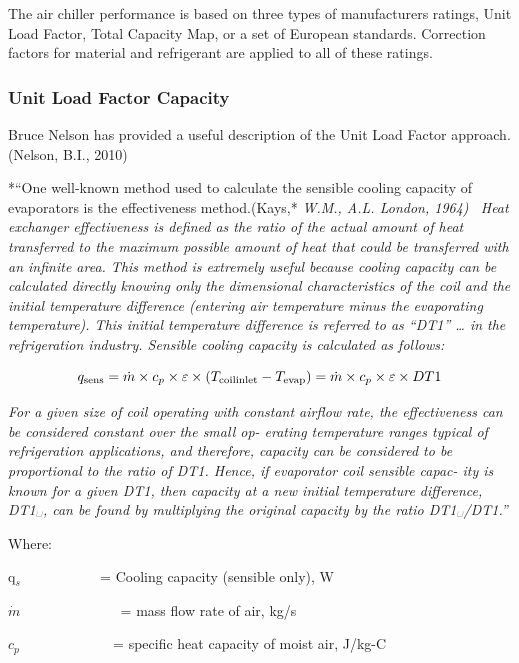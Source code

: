 The air chiller performance is based on three types of manufacturers ratings, Unit Load Factor, Total Capacity Map, or a set of European standards. Correction factors for material and refrigerant are applied to all of these ratings.

\subsubsection{Unit Load Factor Capacity}\label{unit-load-factor-capacity}

Bruce Nelson has provided a useful description of the Unit Load Factor approach.(Nelson, B.I., 2010)

*``One well-known method used to calculate the sensible cooling capacity of evaporators is the effectiveness method.(Kays,* \emph{W.M., A.L. London, 1964) ~Heat exchanger effectiveness is defined as the ratio of the actual amount of heat transferred to the maximum possible amount of heat that could be transferred with an infinite area. This method is extremely useful because cooling capacity can be calculated directly knowing only the dimensional characteristics of the coil and the initial temperature difference (entering air temperature minus the evaporating temperature). This initial temperature difference is referred to as ``DT1'' \ldots{} in the refrigeration industry. Sensible cooling capacity is calculated as follows:}

\begin{equation}
{q_{{\rm{sens}}}} = \dot m \times {c_p} \times \varepsilon  \times ({T_{{\rm{coil inlet}}}} - {T_{{\rm{evap}}}}) = \dot m \times {c_p} \times \varepsilon  \times DT1
\end{equation}

\emph{For a given size of coil operating with constant airflow rate, the effectiveness can be considered constant over the small op- erating temperature ranges typical of refrigeration applications, and therefore, capacity can be considered to be proportional to the ratio of DT1. Hence, if evaporator coil sensible capac- ity is known for a given DT1, then capacity at a new initial temperature difference, DT1␣, can be found by multiplying the original capacity by the ratio DT1␣/DT1.''}

Where:

q\(_{s}\) ~~~~~~~~~~ = Cooling capacity (sensible only), W

\(\dot m\) ~~~~~~~~~~~~~ = mass flow rate of air, kg/s

\({c_p}\) ~~~~~~~~~~~~ = specific heat capacity of moist air, J/kg-C

